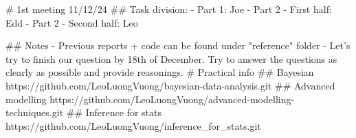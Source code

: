 \documentclass{article}
\begin{document}
\begin{markdown}
# 1st meeting 11/12/24
## Task division:
- Part 1: Joe
- Part 2 - First half: Edd
- Part 2 - Second half: Leo

## Notes
- Previous reports + code can be found under "reference" folder
- Let's try to finish our question by 18th of December. Try to answer the questions as clearly as possible and provide reasonings.
# Practical info
## Bayesian
https://github.com/LeoLuongVuong/bayesian-data-analysis.git
## Advanced modelling
https://github.com/LeoLuongVuong/advanced-modelling-techniques.git
## Inference for stats
https://github.com/LeoLuongVuong/inference_for_stats.git

\end{markdown}
\end{document}
